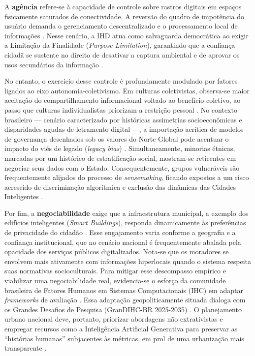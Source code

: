 \documentclass[12pt]{article}
\newcommand{\hlcite}[1]{\colorbox{yellow}{\cite{#1}}} %
\begin{document}
{{    A \textbf{agência} refere-se à capacidade de controle sobre rastros digitais em espaços fisicamente saturados de conectividade. A reversão do quadro de impotência do usuário demanda o gerenciamento descentralizado e o processamento local de informações \hlcite{Sailaja2021, Crabtree2016}. Nesse cenário, a IHD atua como salvaguarda democrática ao exigir a Limitação da Finalidade (\textit{Purpose Limitation}), garantindo que a confiança cidadã se sustente no direito de desativar a captura ambiental e de aprovar os usos secundários da informação \hlcite{Meechan2023, Mashhadi2014}.

    No entanto, o exercício desse controle é profundamente modulado por fatores ligados ao eixo autonomia-coletivismo. Em culturas coletivistas, observa-se maior aceitação do compartilhamento informacional voltado ao benefício coletivo, ao passo que culturas individualistas priorizam a restrição pessoal \cite{Locoro2020}. No contexto brasileiro — cenário caracterizado por históricas assimetrias socioeconômicas e disparidades agudas de letramento digital —, a importação acrítica de modelos de governança desenhados sob os valores do Norte Global pode acentuar o impacto do viés de legado (\textit{legacy bias}) \hlcite{Friedman2024, Lenzi2024}. Simultaneamente, minorias étnicas, marcadas por um histórico de estratificação social, mostram-se reticentes em negociar seus dados com o Estado. Consequentemente, grupos vulneráveis são frequentemente alijados do processo de \textit{sensemaking}, ficando expostos a um risco acrescido de discriminação algorítmica e exclusão das dinâmicas das Cidades Inteligentes \hlcite{malgieri2020vulnerable, Lenzi2024, Yuan20243615}.

    Por fim, a \textbf{negociabilidade} exige que a infraestrutura municipal, a exemplo dos edifícios inteligentes (\textit{Smart Buildings}), responda dinamicamente às preferências de privacidade do cidadão \hlcite{bavaresco2019technological, Brombacher20221863}. Esse engajamento varia conforme a geografia e a confiança institucional, que no cenário nacional é frequentemente abalada pela opacidade dos serviços públicos digitalizados. Nota-se que os moradores se envolvem mais ativamente com informações hiperlocais quando o sistema respeita suas normativas socioculturais. Para mitigar esse descompasso empírico e viabilizar uma negociabilidade real, evidencia-se o esforço da comunidade brasileira de Fatores Humanos em Sistemas Computacionais (IHC) em adaptar \textit{frameworks} de avaliação \hlcite{Belizario2023Interacao, Victorelli2020Human, barcellos2022towards}. Essa adaptação geopoliticamente situada dialoga com os Grandes Desafios de Pesquisa (GranDIHC-BR 2025-2035) \hlcite{Pereira}. O planejamento urbano nacional deve, portanto, priorizar abordagens não extrativistas e empregar recursos como a Inteligência Artificial Generativa para preservar as ``histórias humanas'' subjacentes às métricas, em prol de uma urbanização mais transparente \hlcite{ferreira2024connecting}.
    
}}
\end{document}
